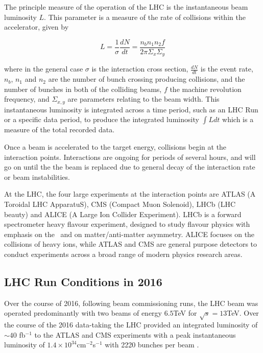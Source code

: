 	The principle measure of the operation of the LHC is the instantaneous beam luminosity $L$. This parameter is a measure of the rate of collisions within the accelerator, given by

	\begin{equation}
		L = \frac{1}{\sigma}\frac{dN}{dt} = \frac{n_bn_1n_2f}{2\pi\Sigma_x\Sigma_y}
	\end{equation}

	where in the general case $\sigma$ is the interaction cross section, $\frac{dN}{dt}$ is the event rate, $n_b$, $n_1$ and $n_2$ are the number of bunch crossing producing collisions, and the number of bunches in both of the colliding beams, $f$ the machine revolution frequency, and $\Sigma_{x, y}$ are parameters relating to the beam width. This instantaneous luminosity is integrated across a time period, such as an LHC Run or a specific data period, to produce the integrated luminosity $\int L dt$ which is a measure of the total recorded data.

	Once a beam is accelerated to the target energy, collisions begin at the interaction points. Interactions are ongoing for periods of several hours, and will go on until the the beam is replaced due to general decay of the interaction rate or beam instabilities.

	At the LHC, the four large experiments at the interaction points are ATLAS (A Toroidal LHC ApparatuS), CMS (Compact Muon Solenoid), LHCb (LHC beauty) and ALICE (A Large Ion Collider Experiment). LHCb is a forward spectrometer heavy flavour experiment, designed to study flavour physics with emphasis on the \bquark\, and on matter/anti-matter asymmetry. ALICE focuses on the collisions of heavy ions, while ATLAS and CMS are general purpose detectors to conduct experiments across a broad range of modern physics research areas.

	\subsection{LHC Run Conditions in 2016}

	Over the course of 2016, following beam commissioning runs, the LHC beam was operated predominantly with two beams of energy $6.5$TeV for $\sqrt{s}=13$TeV. Over the course of the 2016 data-taking the LHC provided an integrated luminosity of $\sim40$ fb$^{-1}$ to the ATLAS and CMS experiments with a peak instantaneous luminosity of $1.4\times10^{34}$cm$^{-2}$s$^{-1}$ with 2220 bunches per beam \cite{Run2016}.


